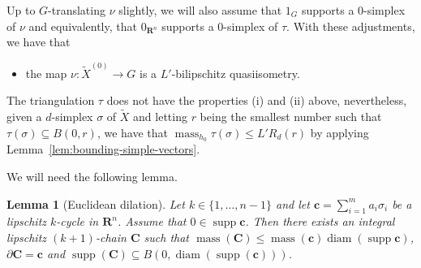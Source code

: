 \documentclass[12pt]{amsart}
\newtheorem{lem}[prop]{Lemma}
\theoremstyle{definition}
\begin{document}
Up to $G$-translating $\nu$ slightly, we will also assume that $1_G$ supports a $0$-simplex of $\nu$ and equivalently, that $0_{\mathbf R^n}$ supports a $0$-simplex of $\tau$. With these adjustments, we have that
\begin{itemize}
    \item[(i')] the map $\nu:\widetilde X^{(0)} \to G$ is a $L'$-bilipschitz quasiisometry.
\end{itemize}


The triangulation $\tau$ does not have the properties (i) and (ii) above, nevertheless, given a $d$-simplex $\sigma$ of $\widetilde X$ and letting $r$ being the smallest number such that $\tau(\sigma) \subseteq  B(0,r)$, we have that $\operatorname{mass}_{h_0} \tau(\sigma) \leqslant L'R_d(r)$ by applying Lemma~\ref{lem:bounding-simple-vectors}.

We will need the following lemma.


\begin{lem}[Euclidean dilation]
\label{lem:coning}
    Let $k \in \{1,\ldots, n-1\}$ and let $\mathbf c = \sum_{i=1}^m a_i \sigma_i$ be a lipschitz $k$-cycle in $\mathbf R^n$. Assume that $0 \in \operatorname{supp} \mathbf c$.
    Then there exists an integral lipschitz $(k+1)$-chain $\mathbf C$ such that $\operatorname{mass}(\mathbf C) \leq \operatorname{mass}(\mathbf c)\operatorname{diam}(\operatorname{supp} \mathbf c)$, $\partial \mathbf C = \mathbf c$ and $\operatorname{supp}(\mathbf C) \subseteq B(0, \operatorname{diam}(\operatorname{supp}(\mathbf c)))$.
\end{lem}
\end{document}
